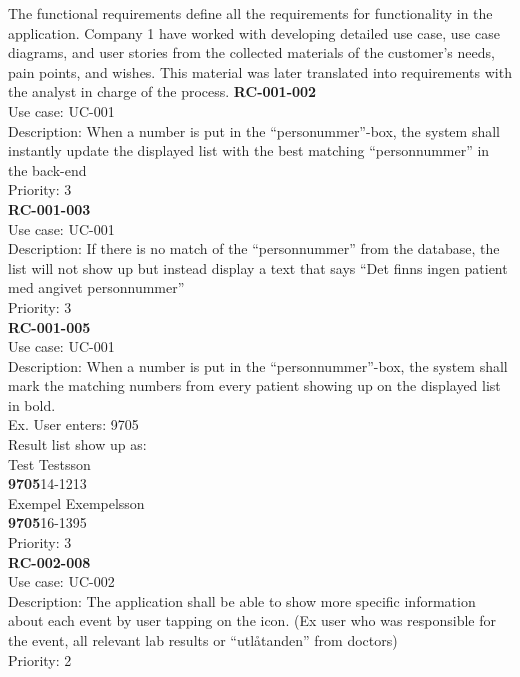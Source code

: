 The functional requirements define all the requirements for functionality in the application. Company 1 have worked with developing detailed use case, use case diagrams, and user stories from the collected materials of the customer's needs, pain points, and wishes. This material was later translated into requirements with the analyst in charge of the process.
\newline
\newline
\textbf{RC-001-002} \\
Use case: UC-001 \\
Description: When a number is put in the “personummer”-box, the system shall instantly update the displayed list with the best matching “personnummer” in the back-end \\
Priority: 3\\
\newline
\textbf{RC-001-003}\\
Use case: UC-001\\
Description: If there is no match of the “personnummer” from the database, the list will not show up but instead display a text that says “Det finns ingen patient med angivet personnummer” \\
Priority: 3\\
\newline
\textbf{RC-001-005}\\
Use case: UC-001\\
Description: When a number is put in the “personnummer”-box, the system shall mark the matching numbers from every patient showing up on the displayed list in bold.\\
Ex. User enters: 9705 \\
Result list show up as:\\
Test Testsson\\
\textbf{9705}14-1213 \\
Exempel Exempelsson \\
\textbf{9705}16-1395
\\
Priority: 3\\
\newline
\textbf{RC-002-008} \\
Use case: UC-002 \\
Description: The application shall be able to show more specific information about each event by user tapping on the icon. (Ex user who was responsible for the event, all relevant lab results or “utlåtanden” from doctors)\\
Priority: 2 \\
